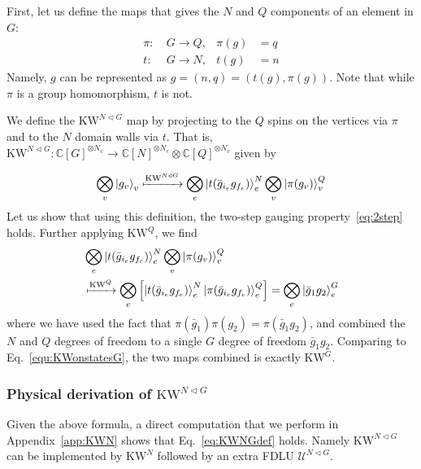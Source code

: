 \documentclass[nofootinbib,prx,twocolumn,showpacs,superscriptaddress,notitlepage,amsmath,amssymb]{revtex4-2}
\theoremstyle{definition}
\def\KW{\text{KW}}
\def\ket#1{\mathinner{|{#1}\rangle}}
\begin{document}
First, let us define the maps that gives the $N$ and $Q$ components of an element in $G$:
\begin{align}
    \pi:& \ G \rightarrow Q , &\pi(g) &= q\\
    t:&  \ G\rightarrow N, & t(g)&=n
\end{align}
Namely, $g$ can be represented as $g=(n,q) =(t(g),\pi(g))$. Note that while $\pi$ is a group homomorphism, $t$ is not.



We define the $\KW^{N\triangleleft G}$ map by projecting to the $Q$ spins on the vertices via $\pi$ and to the $N$ domain walls via $t$. That is, $\KW^{N\triangleleft G}: \mathbb C[G]^{\otimes N_v} \rightarrow \mathbb C[N]^{\otimes N_e} \otimes \mathbb C[Q]^{\otimes N_v} $ given by

\begin{align}
\bigotimes_v \ket{g_v}_v \xmapsto[]{\KW^{N\triangleleft G}} \bigotimes_e  \ket{t(\bar g_{i_e} g_{f_e})}^N_e  \bigotimes_v \ket{\pi(g_v)}^Q_v 
\label{equ:KWonstatesNG}
\end{align}
Let us show that using this definition, the two-step gauging property~\eqref{eq:2step} holds. Further applying $\KW^Q$,  we find
\begin{align}
& \bigotimes_e  \ket{t(\bar g_{i_e} g_{f_e})}^N_e  \bigotimes_v \ket{\pi(g_v)}^Q_v \\
&\xmapsto[]{\KW^{Q}} 
\bigotimes_e  \left[\ket{t(\bar g_{i_e} g_{f_e})}^N_e \ket{\pi(\bar g_{i_e}g_{f_e})}^Q_e \right] =\bigotimes_e \ket{\bar g_1g_2}^G_e \nonumber
\end{align}
where we have used the fact that $\pi(\bar g_1) \pi(g_2) = \pi(\bar g_1g_2)$, and combined the $N$ and $Q$ degrees of freedom to a single $G$ degree of freedom $\bar g_1g_2$. Comparing to Eq.~\eqref{equ:KWonstatesG}, the two maps combined is exactly $\KW^G$.






\subsubsection{Physical derivation of $\KW^{N\triangleleft G}$}\label{sec:Uphysical}

Given the above formula, a direct computation that we perform in Appendix~\ref{app:KWN} shows that Eq.~\eqref{eq:KWNGdef} holds. Namely $\KW^{N\triangleleft G}$ can be implemented by $\KW^N$ followed by an extra FDLU $\mathcal U^{N\triangleleft G}$.
\end{document}
